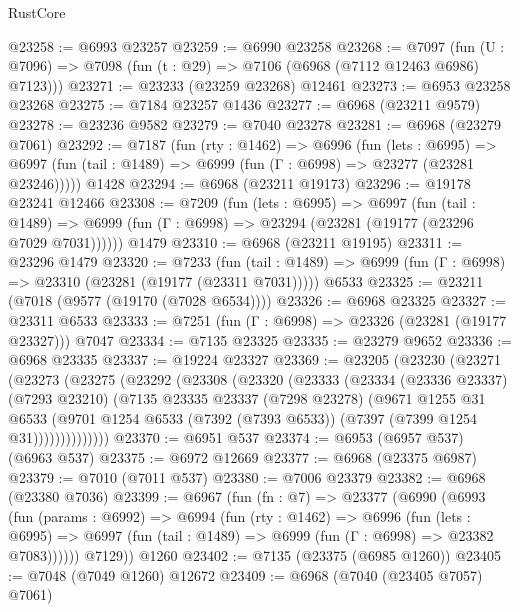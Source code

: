 \begin{lexlean}{RustCore}
\begin{coremodule}
@23258 := @6993 @23257
@23259 := @6990 @23258
@23268 := @7097
    (fun (U : @7096) => @7098 (fun (t : @29) => @7106 (@6968 (@7112 @12463 @6986) @7123)))
@23271 := @23233 (@23259 @23268) @12461
@23273 := @6953 @23258 @23268
@23275 := @7184 @23257 @1436
@23277 := @6968 (@23211 @9579)
@23278 := @23236 @9582
@23279 := @7040 @23278
@23281 := @6968 (@23279 @7061)
@23292 := @7187
    (fun (rty : @1462) =>
    @6996
      (fun (lets : @6995) =>
      @6997 (fun (tail : @1489) => @6999 (fun (Γ : @6998) => @23277 (@23281 @23246)))))
    @1428
@23294 := @6968 (@23211 @19173)
@23296 := @19178 @23241 @12466
@23308 := @7209
    (fun (lets : @6995) =>
    @6997
      (fun (tail : @1489) =>
      @6999 (fun (Γ : @6998) => @23294 (@23281 (@19177 (@23296 @7029 @7031))))))
    @1479
@23310 := @6968 (@23211 @19195)
@23311 := @23296 @1479
@23320 := @7233
    (fun (tail : @1489) => @6999 (fun (Γ : @6998) => @23310 (@23281 (@19177 (@23311 @7031)))))
    @6533
@23325 := @23211 (@7018 (@9577 (@19170 (@7028 @6534))))
@23326 := @6968 @23325
@23327 := @23311 @6533
@23333 := @7251 (fun (Γ : @6998) => @23326 (@23281 (@19177 @23327))) @7047
@23334 := @7135 @23325
@23335 := @23279 @9652
@23336 := @6968 @23335
@23337 := @19224 @23327
@23369 := @23205
    (@23230
      (@23271
        (@23273
          (@23275
            (@23292
              (@23308
                (@23320
                  (@23333
                    (@23334
                      (@23336 @23337)
                      (@7293 @23210)
                      (@7135
                        @23335
                        @23337
                        (@7298 @23278)
                        (@9671
                          @1255
                          @31
                          @6533
                          (@9701
                            @1254
                            @6533
                            (@7392 (@7393 @6533))
                            (@7397 (@7399 @1254 @31))))))))))))))
@23370 := @6951 @537
@23374 := @6953 (@6957 @537) (@6963 @537)
@23375 := @6972 @12669
@23377 := @6968 (@23375 @6987)
@23379 := @7010 (@7011 @537)
@23380 := @7006 @23379
@23382 := @6968 (@23380 @7036)
@23399 := @6967
    (fun (fn : @7) =>
    @23377
      (@6990
        (@6993
          (fun (params : @6992) =>
          @6994
            (fun (rty : @1462) =>
            @6996
              (fun (lets : @6995) =>
              @6997 (fun (tail : @1489) => @6999 (fun (Γ : @6998) => @23382 @7083))))))
        @7129))
    @1260
@23402 := @7135 (@23375 (@6985 @1260))
@23405 := @7048 (@7049 @1260) @12672
@23409 := @6968 (@7040 (@23405 @7057) @7061)

\end{coremodule}
\end{lexlean}
